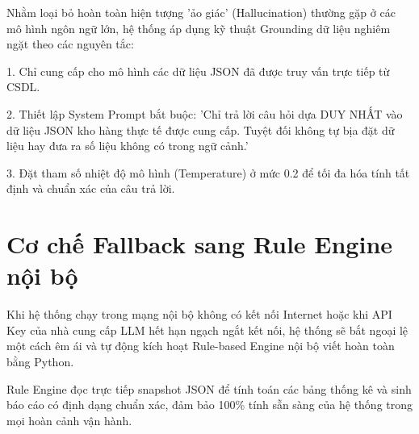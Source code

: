 Nhằm loại bỏ hoàn toàn hiện tượng 'ảo giác' (Hallucination) thường gặp ở các mô hình ngôn ngữ lớn, hệ thống áp dụng kỹ thuật Grounding dữ liệu nghiêm ngặt theo các nguyên tắc:

1. Chỉ cung cấp cho mô hình các dữ liệu JSON đã được truy vấn trực tiếp từ CSDL.

2. Thiết lập System Prompt bắt buộc: 'Chỉ trả lời câu hỏi dựa DUY NHẤT vào dữ liệu JSON kho hàng thực tế được cung cấp. Tuyệt đối không tự bịa đặt dữ liệu hay đưa ra số liệu không có trong ngữ cảnh.'

3. Đặt tham số nhiệt độ mô hình (Temperature) ở mức 0.2 để tối đa hóa tính tất định và chuẩn xác của câu trả lời.

\section{Cơ chế Fallback sang Rule Engine nội bộ}

Khi hệ thống chạy trong mạng nội bộ không có kết nối Internet hoặc khi API Key của nhà cung cấp LLM hết hạn ngạch ngắt kết nối, hệ thống sẽ bắt ngoại lệ một cách êm ái và tự động kích hoạt Rule-based Engine nội bộ viết hoàn toàn bằng Python.

Rule Engine đọc trực tiếp snapshot JSON để tính toán các bảng thống kê và sinh báo cáo có định dạng chuẩn xác, đảm bảo 100\% tính sẵn sàng của hệ thống trong mọi hoàn cảnh vận hành.

